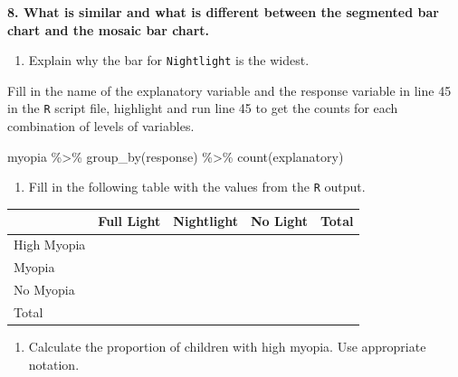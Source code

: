 \documentclass[
]{report}
\newenvironment{Shaded}{\begin{snugshade}}{\end{snugshade}}
\newcommand{\FunctionTok}[1]{\textcolor[rgb]{0.00,0.00,0.00}{#1}}
\newcommand{\NormalTok}[1]{#1}
\newcommand{\SpecialCharTok}[1]{\textcolor[rgb]{0.00,0.00,0.00}{#1}}
\providecommand{\tightlist}{%
  \setlength{\itemsep}{0pt}\setlength{\parskip}{0pt}}
\begin{document}
\textbf{8. What is similar and what is different between the segmented bar chart and the mosaic bar chart.}

\vspace{1in}

\begin{enumerate}
\def\labelenumi{\arabic{enumi}.}
\setcounter{enumi}{8}
\tightlist
\item
  Explain why the bar for \texttt{Nightlight} is the widest.
\end{enumerate}

\vspace{0.8in}

Fill in the name of the explanatory variable and the response variable in line 45 in the \texttt{R} script file, highlight and run line 45 to get the counts for each combination of levels of variables.

\begin{Shaded}
\begin{Highlighting}[]
\NormalTok{myopia }\SpecialCharTok{\%\textgreater{}\%} \FunctionTok{group\_by}\NormalTok{(response) }\SpecialCharTok{\%\textgreater{}\%} \FunctionTok{count}\NormalTok{(explanatory)}
\end{Highlighting}
\end{Shaded}

\begin{enumerate}
\def\labelenumi{\arabic{enumi}.}
\setcounter{enumi}{9}
\tightlist
\item
  Fill in the following table with the values from the \texttt{R} output.
\end{enumerate}

\begin{longtable}[]{@{}lllll@{}}
\toprule
& Full Light & Nightlight & No Light & Total \\
\midrule
\endhead
High Myopia & & & & \\
Myopia & & & & \\
No Myopia & & & & \\
Total & & & & \\
\bottomrule
\end{longtable}

\begin{enumerate}
\def\labelenumi{\arabic{enumi}.}
\setcounter{enumi}{10}
\tightlist
\item
  Calculate the proportion of children with high myopia. Use appropriate notation.
\end{enumerate}

\vspace{0.3in}
\end{document}
